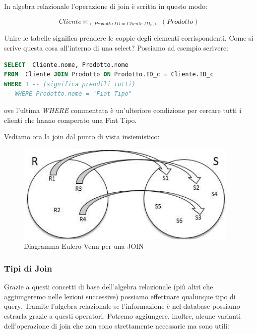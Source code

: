 In algebra relazionale l'operazione di join è scritta in questo modo: 

\[
	Cliente \Join_{<Prodotto.ID=Cliente.ID_c>}(Prodotto)
\]

Unire le tabelle significa prendere le coppie degli elementi corrispondenti. Come si scrive questa cosa all'interno di una select? Possiamo ad esempio scrivere: 

\begin{lstlisting}[language=SQL]
SELECT  Cliente.nome, Prodotto.nome 
FROM  Cliente JOIN Prodotto ON Prodotto.ID_c = Cliente.ID_c 
WHERE 1 -- (significa prendili tutti)
-- WHERE Prodotto.nome = "Fiat Tipo"
\end{lstlisting}

ove l'ultima \textit{WHERE} commentata è un'ulteriore condizione per cercare tutti i clienti che hanno comperato una Fiat Tipo.

Vediamo ora la join dal punto di vista insiemistico:

\begin{center}
\begin{figure}[H]
\centering
\includegraphics[scale=1]{figures/join_set.png}
\caption{Diagramma Eulero-Venn per una JOIN} 
\end{figure}
\end{center}


\subsubsection{Tipi di Join}

Grazie a questi concetti di base dell'algebra relazionale (più altri che aggiungeremo nelle lezioni successive) possiamo effettuare qualunque tipo di query. Tramite l'algebra relazionale se l'informazione è nel database possiamo estrarla grazie a questi operatori. Potremo aggiungere, inoltre, alcune varianti dell'operazione di join che non sono strettamente necessarie ma sono utili: 

